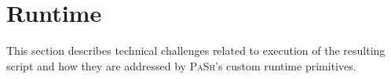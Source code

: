 \documentclass[sigplan, review, screen, anonymous]{acmart}
\newcommand{\todo}[1]{\hl{#1}\xspace}
\newcommand{\kk}[1]{[{\color{magenta}kk: #1}]}
\newcommand{\sys}{{\scshape PaSh}\xspace}
\begin{document}



\section{Runtime}
\label{impl}
\label{optimizer}


This section describes technical challenges related to execution of the resulting script and how they are addressed by \sys's custom runtime primitives.


\end{document}

